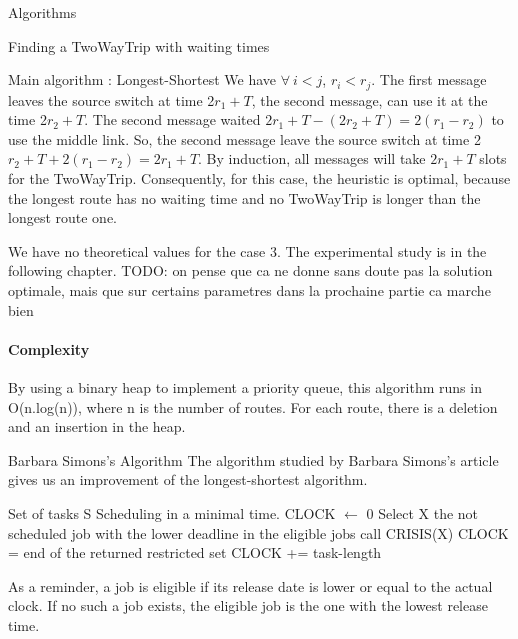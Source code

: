 \documentclass[a4paper,10pt]{report}
\newcommand{\todo}[1]{}
\renewcommand{\todo}[1]{{\color{red} TODO: {#1}}}
\begin{document}
\begin{chapter}{Algorithms}
\begin{section}{Finding a TwoWayTrip with waiting times}
\begin{subsection}{Main algorithm : Longest-Shortest}
We have $\forall \ i<j$, $r_i<r_j$.
The first message leaves the source switch at time 2$r_1+T$, the second message, can use it at the time 2$r_2+T$.
The second message waited $2r_1+T-(2r_2+T) = 2(r_1-r_2)$ to use the middle link. So, the second message leave the source switch at time
2$r_2+T + 2(r_1-r_2) = 2r_1 +T$.
By induction, all messages will take $2r_1 +T$ slots for the TwoWayTrip.
Consequently, for this case, the heuristic is optimal, because the longest route has no waiting time and no TwoWayTrip is longer than the longest route one.

We have no theoretical values for the case 3. The experimental study is in the following chapter.
\todo{on pense que ca ne donne sans doute pas la solution optimale, mais que sur certains parametres dans la prochaine partie ca marche bien}

\paragraph{Complexity}
By using a binary heap to implement a priority queue, this algorithm runs in O(n.log(n)), 
where n is the number of routes. For each route, there is a deletion and an insertion in the heap.
\end{subsection}

\begin{subsection}{Barbara Simons's Algorithm}
 The algorithm studied by Barbara Simons's article \cite{simons1978fast} gives us an improvement of the longest-shortest algorithm.
 \begin{algorithm}[H]
\caption{Simons Main Algorithm}
\begin{algorithmic}
\REQUIRE Set of tasks S
\ENSURE Scheduling in a minimal time.
\STATE CLOCK $\leftarrow$ 0
\STATE Select X the not scheduled job with the lower deadline in the eligible jobs
\STATE call CRISIS(X)
\STATE CLOCK = end of the returned restricted set
\ELSE
\STATE CLOCK += task-length
\ENDIF

\ENDWHILE

\end{algorithmic}
\end{algorithm}
As a reminder, a job is eligible if its release date is lower or equal to the actual clock. If no such a job exists, the eligible job is the one
with the lowest release time.


\end{subsection}
\end{section}
\end{chapter}
\end{document}
